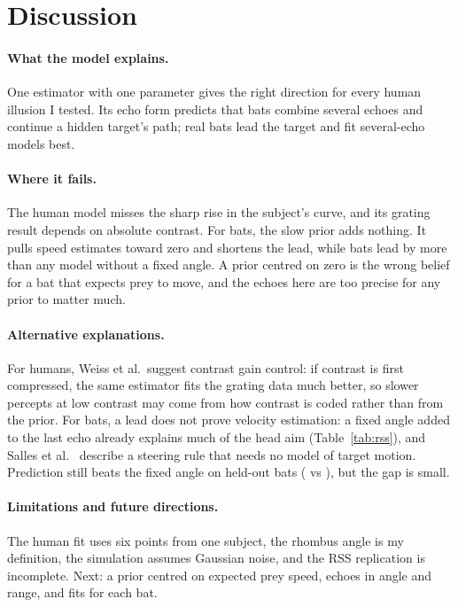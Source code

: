 \documentclass[11pt]{article}
\begin{document}
\section{Discussion}
\paragraph{What the model explains.} One estimator with one parameter gives the right direction for every human illusion I tested. Its echo form predicts that bats combine several echoes and continue a hidden target's path; real bats lead the target and fit several-echo models best.

\paragraph{Where it fails.} The human model misses the sharp rise in the subject's curve, and its grating result depends on absolute contrast. For bats, the slow prior adds nothing. It pulls speed estimates toward zero and shortens the lead, while bats lead by more than any model without a fixed angle. A prior centred on zero is the wrong belief for a bat that expects prey to move, and the echoes here are too precise for any prior to matter much.

\paragraph{Alternative explanations.} For humans, Weiss et al.\ suggest contrast gain control: if contrast is first compressed, the same estimator fits the grating data much better, so slower percepts at low contrast may come from how contrast is coded rather than from the prior. For bats, a lead does not prove velocity estimation: a fixed angle added to the last echo already explains much of the head aim (Table~\ref{tab:rss}), and Salles et al.\ \cite{salles2021} describe a steering rule that needs no model of target motion. Prediction still beats the fixed angle on held-out bats (\realCvPredictive{} vs \realCvFixed), but the gap is small.

\paragraph{Limitations and future directions.} The human fit uses six points from one subject, the rhombus angle is my definition, the simulation assumes Gaussian noise, and the RSS replication is incomplete. Next: a prior centred on expected prey speed, echoes in angle and range, and fits for each bat.
\end{document}

